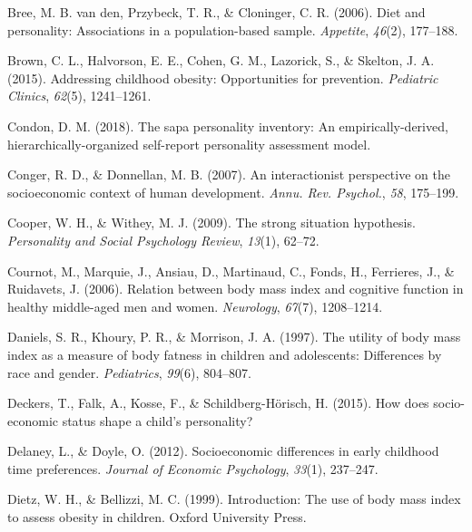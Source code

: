 \documentclass[man]{apa6}
\begin{document}
\leavevmode\hypertarget{ref-van2006diet}{}%
Bree, M. B. van den, Przybeck, T. R., \& Cloninger, C. R. (2006). Diet and personality: Associations in a population-based sample. \emph{Appetite}, \emph{46}(2), 177--188.

\leavevmode\hypertarget{ref-brown2015addressing}{}%
Brown, C. L., Halvorson, E. E., Cohen, G. M., Lazorick, S., \& Skelton, J. A. (2015). Addressing childhood obesity: Opportunities for prevention. \emph{Pediatric Clinics}, \emph{62}(5), 1241--1261.

\leavevmode\hypertarget{ref-condon2018sapa}{}%
Condon, D. M. (2018). The sapa personality inventory: An empirically-derived, hierarchically-organized self-report personality assessment model.

\leavevmode\hypertarget{ref-conger2007interactionist}{}%
Conger, R. D., \& Donnellan, M. B. (2007). An interactionist perspective on the socioeconomic context of human development. \emph{Annu. Rev. Psychol.}, \emph{58}, 175--199.

\leavevmode\hypertarget{ref-cooper2009strong}{}%
Cooper, W. H., \& Withey, M. J. (2009). The strong situation hypothesis. \emph{Personality and Social Psychology Review}, \emph{13}(1), 62--72.

\leavevmode\hypertarget{ref-cournot2006relation}{}%
Cournot, M., Marquie, J., Ansiau, D., Martinaud, C., Fonds, H., Ferrieres, J., \& Ruidavets, J. (2006). Relation between body mass index and cognitive function in healthy middle-aged men and women. \emph{Neurology}, \emph{67}(7), 1208--1214.

\leavevmode\hypertarget{ref-daniels1997utility}{}%
Daniels, S. R., Khoury, P. R., \& Morrison, J. A. (1997). The utility of body mass index as a measure of body fatness in children and adolescents: Differences by race and gender. \emph{Pediatrics}, \emph{99}(6), 804--807.

\leavevmode\hypertarget{ref-deckers2015does}{}%
Deckers, T., Falk, A., Kosse, F., \& Schildberg-Hörisch, H. (2015). How does socio-economic status shape a child's personality?

\leavevmode\hypertarget{ref-delaney2012socioeconomic}{}%
Delaney, L., \& Doyle, O. (2012). Socioeconomic differences in early childhood time preferences. \emph{Journal of Economic Psychology}, \emph{33}(1), 237--247.

\leavevmode\hypertarget{ref-dietz1999introduction}{}%
Dietz, W. H., \& Bellizzi, M. C. (1999). Introduction: The use of body mass index to assess obesity in children. Oxford University Press.
\end{document}
